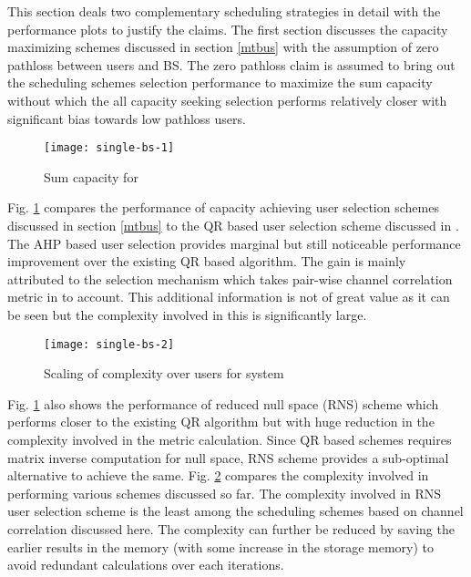 
This section deals two complementary scheduling strategies in detail with the performance plots to justify the claims. The first section discusses the capacity maximizing schemes discussed in section \ref{mtbus} with the assumption of zero pathloss between users and BS. The zero pathloss claim is assumed to bring out the scheduling schemes selection performance to maximize the sum capacity without which the all capacity seeking selection performs relatively closer with significant bias towards low pathloss users.
\begin{figure}
\centering
\texttt{[image: single-bs-1]}
\caption[short]{Sum capacity for }
\label{single-bs-f1}
\end{figure}

Fig. \ref{single-bs-f1} compares the performance of capacity achieving user selection schemes discussed in section \ref{mtbus} to the QR based user selection scheme discussed in \cite{antti_user_selection,jin2010novel}. The AHP based user selection provides marginal but still noticeable performance improvement over the existing QR based algorithm. The gain is mainly attributed to the selection mechanism which takes pair-wise channel correlation metric in to account. This additional information is not of great value as it can be seen but the complexity involved in this is significantly large. 
\begin{figure}
\centering
\texttt{[image: single-bs-2]}
\caption[short]{Scaling of complexity over users for  system}
\label{single-bs-f2}
\end{figure}

Fig. \ref{single-bs-f1} also shows the performance of reduced null space (RNS) scheme which performs closer to the existing QR algorithm but with huge reduction in the complexity involved in the metric calculation. Since QR based schemes requires matrix inverse computation for null space, RNS scheme provides a sub-optimal alternative to achieve the same. Fig. \ref{single-bs-f2} compares the complexity involved in performing various schemes discussed so far. The complexity involved in RNS user selection scheme is the least among the scheduling schemes based on channel correlation discussed here. The complexity can further be reduced by saving the earlier results in the memory (with some increase in the storage memory) to avoid redundant calculations over each iterations. 